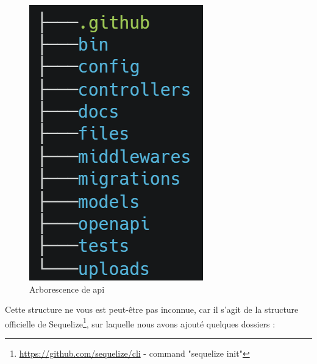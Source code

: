 \begin{figure}[H]
    \includegraphics[width=\textwidth,height=0.25\textheight,keepaspectratio]{images/serveur/tree_folders.png}
    \centering
    \caption[SourceCode : Arborescence de l\'API]{Arborescence de \Gls{api}}
    \label{fig:arborenceAPI}
\end{figure}

Cette structure ne vous est peut-être pas inconnue, car il s'agit de la structure officielle de Sequelize\footnote{
    \url{https://github.com/sequelize/cli} - command "sequelize init"
}, sur laquelle nous avons ajouté quelques dossiers :

